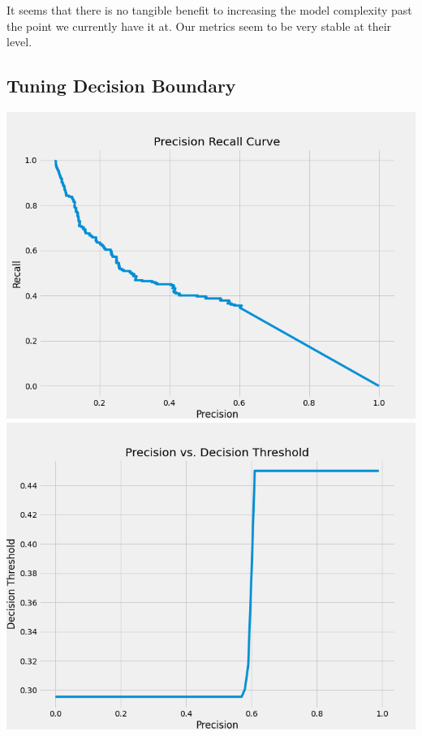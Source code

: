 \documentclass[12pt]{article}
\begin{document}
	It seems that there is no tangible benefit to increasing the model complexity past the point we currently have it at. Our metrics seem to be very stable at their level. 
	
	
	\subsection{Tuning Decision Boundary }
	
	\begin{center}
		\includegraphics[scale=0.3]{../notebooks/pr_curve_nn.png}
		\includegraphics[scale=0.3]{../notebooks/precisionvsthreshold_nn.png}
	\end{center}
	
\end{document}
